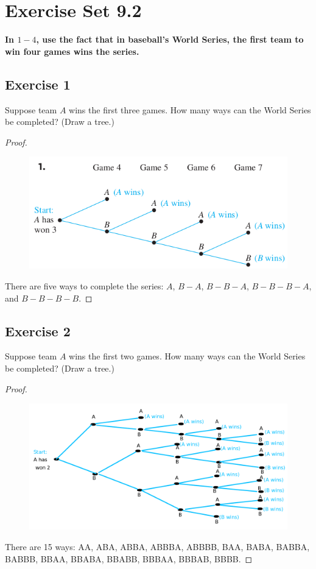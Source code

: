 \documentclass[14pt]{extarticle}
\newcommand{\cy}{\color{cyan}}
\begin{document}
\section{Exercise Set 9.2}
{\bf \cy In $1-4$, use the fact that in baseball’s World Series, the first team to win four games wins the series.}

\subsection{Exercise 1}
Suppose team $A$ wins the first three games. How many ways can the World Series be completed? (Draw a tree.)

\begin{proof}
\begin{figure}[ht!]
\centering
\includegraphics[scale=0.43]{../images/9.2.1.png}
\end{figure}

There are five ways to complete the series: $A$, \(B-A\), \(B-B-A\), \(B-B-B-A\), and \(B-B-B-B\).
\end{proof}

\subsection{Exercise 2}
Suppose team $A$ wins the first two games. How many ways can the World Series be completed? (Draw a tree.)

\begin{proof}
\begin{figure}[ht!]
\centering
\includegraphics[scale=0.25]{../images/9.2.2.png}
\end{figure}

There are 15 ways: AA, ABA, ABBA, ABBBA, ABBBB, BAA, BABA, BABBA, BABBB, BBAA, BBABA, BBABB, BBBAA, BBBAB, BBBB.
\end{proof}
\end{document}
